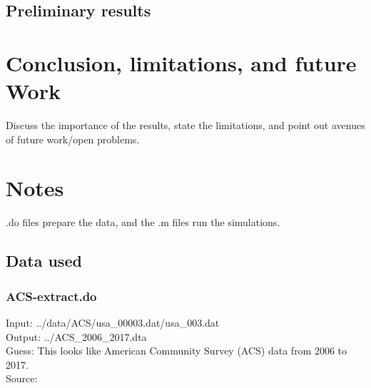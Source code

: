 \documentclass[11pt]{article}
\begin{document}
\subsection{Preliminary results}


\section{Conclusion, limitations, and future Work}
Discuss the importance of the results, state the limitations, and point out avenues of future work/open problems.
\newpage
\section{Notes}
.do files prepare the data, and the .m files run the simulations.
\subsection{Data used}
\subsubsection{ACS-extract.do}
Input: ../data/ACS/usa\_00003.dat/usa\_003.dat \\
Output: ../ACS\_2006\_2017.dta \\
Guess: This looks like American Community Survey (ACS) data from 2006 to 2017. \\
Source: 



 
\end{document}
